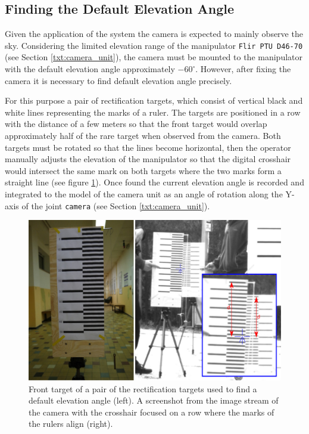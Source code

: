 \subsection{Finding the Default Elevation Angle}

Given the application of the system the camera is expected to mainly observe the sky. Considering the limited elevation range of the manipulator \texttt{Flir PTU D46-70} (see Section \ref{txt:camera_unit}), the camera must be mounted to the manipulator with the default elevation angle approximately $-60^{\circ}$. However, after fixing the camera it is necessary to find default elevation angle precisely. 

For this purpose a pair of rectification targets, which consist of vertical black and white lines representing the marks of a ruler. The targets are positioned in a row with the distance of a few meters so that the front target would overlap approximately half of the rare target when observed from the camera. Both targets must be rotated so that the lines become horizontal, then the operator manually adjusts the elevation of the manipulator so that the digital crosshair would intersect the same mark on both targets where the two marks form a straight line (see figure \ref{fig:rect_default_elevation_angle}). Once found the current elevation angle is recorded and integrated to the model of the camera unit as an angle of rotation along the Y-axis of the joint \texttt{camera} (see Section \ref{txt:camera_unit}).

\begin{figure}[htb]
	\centering
	\includegraphics[width=13cm]{fig/rect_default_elevation_angle.pdf}
	\caption{Front target of a pair of the rectification targets used to find a default elevation angle (left). A screenshot from the image stream of the camera with the crosshair focused on a row where the marks of the rulers align (right).}
	\label{fig:rect_default_elevation_angle}
\end{figure}


